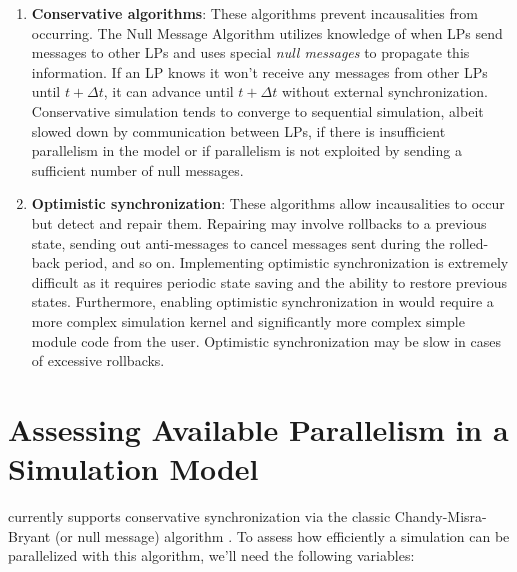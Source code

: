 \begin{enumerate}
  \item{\textbf{Conservative algorithms}: These algorithms prevent incausalities from
    occurring. The Null Message Algorithm utilizes knowledge of when LPs send
    messages to other LPs and uses special \textit{null messages} to propagate
    this information. If an LP knows it won't receive any messages from other LPs
    until $t+\Delta t$, it can advance until $t+\Delta t$ without external
    synchronization. Conservative simulation tends to converge to sequential
    simulation, albeit slowed down by communication between LPs, if there is
    insufficient parallelism in the model or if parallelism is not exploited by
    sending a sufficient number of null messages.}

  \item{\textbf{Optimistic synchronization}: These algorithms allow incausalities to occur but
    detect and repair them. Repairing may involve rollbacks to a previous state,
    sending out anti-messages to cancel messages sent during the rolled-back
    period, and so on. Implementing optimistic synchronization is extremely
    difficult as it requires periodic state saving and the ability to restore
    previous states. Furthermore, enabling optimistic synchronization in {\opp}
    would require a more complex simulation kernel and significantly more complex
    simple module code from the user. Optimistic
    synchronization may be slow in cases of excessive rollbacks.}
\end{enumerate}


\section{Assessing Available Parallelism in a Simulation Model}
\label{sec:parallel-exec:assessing-available-parallelism}

{\opp} currently supports conservative synchronization
via the classic Chandy-Misra-Bryant (or null message) algorithm
\cite{chandymisra79}.
To assess how efficiently a simulation can be parallelized
with this algorithm, we'll need the following variables:

